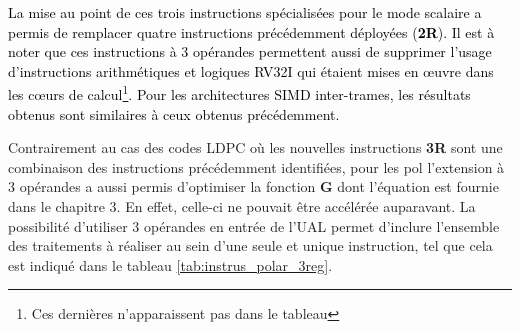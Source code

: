 \documentclass[../main.tex]{subfiles}
\begin{document}
\textcolor{black}{La mise au point de ces trois instructions spécialisées pour le mode scalaire a permis de remplacer quatre instructions précédemment déployées (\textbf{2R}).
Il est à noter que ces instructions à 3 opérandes permettent aussi de supprimer l'usage d'instructions arithmétiques et logiques RV32I qui étaient mises en œuvre dans les cœurs de calcul\footnote{Ces dernières n'apparaissent pas dans le tableau}.
Pour les architectures SIMD inter-trames, les résultats obtenus sont similaires à ceux obtenus précédemment.}

Contrairement au cas des codes LDPC où les nouvelles instructions \textbf{3R} sont une combinaison des instructions précédemment identifiées, pour les \acrlong{pol} l'extension à 3 opérandes a aussi permis d'optimiser la fonction \textbf{G} dont l'équation est fournie dans le chapitre 3.
En effet, celle-ci ne pouvait être accélérée auparavant.
La possibilité d'utiliser 3 opérandes en entrée de l'UAL permet d'inclure l'ensemble des traitements à réaliser au sein d'une seule et unique instruction, tel que cela est indiqué dans le tableau \ref{tab:instrus_polar_3reg}.
\end{document}
